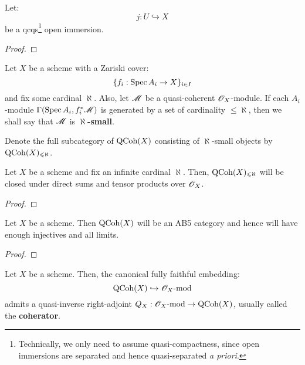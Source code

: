            \begin{lemma} \label{lemma: extending_qcoh_from_qc_open_subschemes}
                Let:
                    $$j: U \hookrightarrow X$$
                be a qcqs\footnote{Technically, we only need to assume quasi-compactness, since open immersions are separated and hence quasi-separated \textit{a priori}.} open immersion.
            \end{lemma}
                \begin{proof}
                    
                \end{proof}
            
            \begin{definition} \label{def: small_quasi_coherent_modules}
                Let $X$ be a scheme with a Zariski cover:
                    $$\{f_i: \operatorname{Spec} A_i \to X\}_{i \in I}$$
                and fix some cardinal $\aleph$. Also, let $\mathscr{M}$ be a quasi-coherent $\mathscr{O}_X$-module. If each $A_i$-module $\Gamma(\operatorname{Spec} A_i, f_i^*\mathscr{M})$ is generated by a set of cardinality $\leq \aleph$, then we shall say that $\mathscr{M}$ is \textbf{$\aleph$-small}. 

                Denote the full subcategory of $\mathrm{QCoh}(X)$ consisting of $\aleph$-small objects by $\mathrm{QCoh}(X)_{\leqslant \aleph}$.
            \end{definition}
            \begin{lemma} \label{lemma: closure_properties_of_small_quasi_coherent_modules}
                Let $X$ be a scheme and fix an infinite cardinal $\aleph$. Then, $\mathrm{QCoh}(X)_{\leqslant \aleph}$ will be closed under direct sums and tensor products over $\mathscr{O}_X$.
            \end{lemma}
                \begin{proof}
                    
                \end{proof}
            \begin{theorem} \label{theorem: qcoh_homological_properties}
                Let $X$ be a scheme. Then $\mathrm{QCoh}(X)$ will be an AB5 category and hence will have enough injectives and all limits. 
            \end{theorem}
                \begin{proof}
                    
                \end{proof}
            \begin{corollary}
                Let $X$ be a scheme. Then, the canonical fully faithful embedding:
                    $$\mathrm{QCoh}(X) \hookrightarrow \mathscr{O}_X\text{-}\mathrm{mod}$$
                admits a quasi-inverse right-adjoint $Q_X: \mathscr{O}_X\text{-}\mathrm{mod} \to \mathrm{QCoh}(X)$, usually called the \textbf{coherator}.
            \end{corollary}
                
